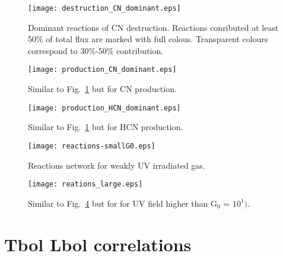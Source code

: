 \documentclass{aa}
\begin{document}
\begin{appendix}
\begin{figure} \texttt{[image: destruction\_CN\_dominant.eps]} \caption{Dominant reactions
of CN destruction. Reactions conributed at least 50$\%$ of total flux are marked with full colous.
Transparent colours correspond to 30$\%$-50$\%$ contribution.} \label{CN_dest} \end{figure}

\begin{figure} 
\texttt{[image: production\_CN\_dominant.eps]} 
\caption{Similar to Fig.~\ref{CN_dest} but for CN production.} 
\label{CN_prod}
\end{figure}

\begin{figure} 
\texttt{[image: production\_HCN\_dominant.eps]} 
\caption{Similar to Fig.~\ref{CN_dest} but for HCN production.} 
\label{HCN_prod} 
\end{figure}

\begin{figure} 
\texttt{[image: reactions-smallG0.eps]} 
\caption{Reactions network for weakly UV irradiated gas.} 
\label{reactions_smallG0} 
\end{figure}

\begin{figure} 
\texttt{[image: reations\_large.eps]} 
\caption{Similar to Fig.~\ref{reactions_smallG0} but for for UV field higher than G$_0$ = $10^{1})$.}
\label{reactions_largeG0} 
\end{figure}


\section{Tbol Lbol correlations} 


\end{appendix}
\end{document}
